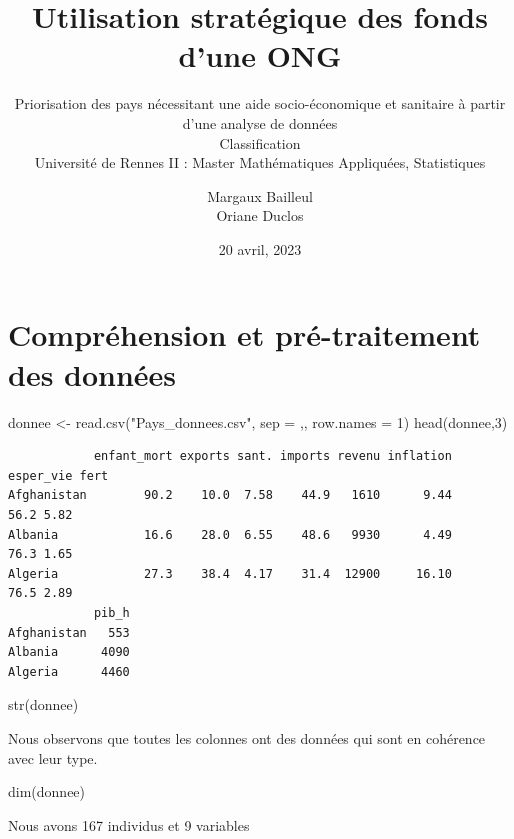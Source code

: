 \documentclass[
]{article}
\title{Utilisation stratégique des fonds d'une ONG}
\subtitle{Priorisation des pays nécessitant une aide socio-économique et
sanitaire à partir d'une analyse de données\\
Classification\\
Université de Rennes II : Master Mathématiques Appliquées, Statistiques}
\author{Margaux Bailleul\\
Oriane Duclos}
\date{20 avril, 2023}
\newenvironment{Shaded}{}{}
\newcommand{\AttributeTok}[1]{#1}
\newcommand{\DecValTok}[1]{#1}
\newcommand{\FunctionTok}[1]{#1}
\newcommand{\NormalTok}[1]{#1}
\newcommand{\OtherTok}[1]{\textcolor[rgb]{1.00,0.25,0.00}{#1}}
\newcommand{\StringTok}[1]{\textcolor[rgb]{0.00,0.50,0.50}{#1}}
\begin{document}
\maketitle

{
\setcounter{tocdepth}{2}
\tableofcontents
}
\hypertarget{compruxe9hension-et-pruxe9-traitement-des-donnuxe9es}{%
\section{Compréhension et pré-traitement des
données}\label{compruxe9hension-et-pruxe9-traitement-des-donnuxe9es}}

\begin{Shaded}
\begin{Highlighting}[]
\NormalTok{donnee }\OtherTok{\textless{}{-}} \FunctionTok{read.csv}\NormalTok{(}\StringTok{"Pays\_donnees.csv"}\NormalTok{, }\AttributeTok{sep =} \StringTok{\textquotesingle{},\textquotesingle{}}\NormalTok{, }\AttributeTok{row.names =} \DecValTok{1}\NormalTok{)}
\FunctionTok{head}\NormalTok{(donnee,}\DecValTok{3}\NormalTok{)}
\end{Highlighting}
\end{Shaded}

\begin{verbatim}
            enfant_mort exports sant. imports revenu inflation esper_vie fert
Afghanistan        90.2    10.0  7.58    44.9   1610      9.44      56.2 5.82
Albania            16.6    28.0  6.55    48.6   9930      4.49      76.3 1.65
Algeria            27.3    38.4  4.17    31.4  12900     16.10      76.5 2.89
            pib_h
Afghanistan   553
Albania      4090
Algeria      4460
\end{verbatim}

\begin{Shaded}
\begin{Highlighting}[]
\FunctionTok{str}\NormalTok{(donnee)}
\end{Highlighting}
\end{Shaded}

Nous observons que toutes les colonnes ont des données qui sont en
cohérence avec leur type.

\begin{Shaded}
\begin{Highlighting}[]
\FunctionTok{dim}\NormalTok{(donnee)}
\end{Highlighting}
\end{Shaded}

Nous avons 167 individus et 9 variables
\end{document}

